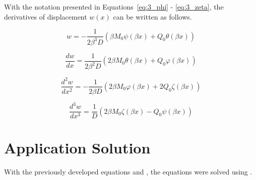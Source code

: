 With the notation presented in Equations~\ref{eq:3_phi} - \ref{eq:3_zeta}, the derivatives of displacement $w(x)$ can be written as follows.

\begin{equation}
	\label{eq:3_w0}
	w = - \frac{1}{2 \beta^3 D} \left( \beta M_0 \psi(\beta x) + Q_0 \theta (\beta x) \right)
\end{equation}

\begin{equation}
	\label{eq:3_w1}
	\frac{dw}{dx} = \frac{1}{2 \beta^2 D} \left( 2 \beta M_0 \theta(\beta x) + Q_0 \varphi(\beta x) \right)	
\end{equation}

\begin{equation}
	\label{eq:3_w2}
	\frac{d^2w}{dx^2} = - \frac{1}{2 \beta D} \left( 2 \beta M_0 \varphi(\beta x) + 2 Q_0 \zeta(\beta x) \right)
\end{equation}

\begin{equation}
	\label{eq:3_w3}
	\frac{d^3w}{dx^3} = \frac{1}{D} \left( 2 \beta M_0 \zeta(\beta x) - Q_0 \psi(\beta x) \right)
\end{equation}


\section{Application Solution}


With the previously developed equations and \cite{roarks}, the equations were solved using \cite{EXCEL}.
